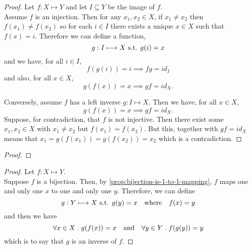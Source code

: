 \documentclass[../MathsNotesBase.tex]{subfiles}
\begin{document}
{		\bigskip
		\begin{proof}
			Let ${ f: X \longmapsto Y }$ and let ${ I \subseteq Y }$ be the image of $f$.\\
			
			Assume $f$ is an injection. Then for any ${ x_1, x_2 \in X }$, if ${ x_1 \neq x_2 }$ then ${ f(x_1) \neq f(x_2) }$ so for each ${ i \in I }$ there exists a unique ${ x \in X }$ such that ${ f(x) = i }$. Therefore we can define a function,
			\[ g: I \longmapsto X \text{ s.t. } g(i) = x \]
			and we have, for all ${ i \in I }$,
			\[ f(g(i)) = i \implies fg = id_I \]
			and also, for all ${ x \in X }$,
			\[ g(f(x)) = x \implies gf = id_X. \]
			
			Conversely, assume $f$ has a left inverse ${ g: I \longmapsto X }$. Then we have, for all ${ x \in X }$,
			\[ g(f(x)) = x \implies gf = id_X. \]
			Suppose, for contradiction, that $f$ is not injective. Then there exist some ${ x_1, x_2 \in X }$ with ${ x_1 \neq x_2 }$ but ${ f(x_1) = f(x_2) }$. But this, together with ${ gf = id_X }$ means that ${ x_1 = g(f(x_1)) = g(f(x_2)) = x_2 }$ which is a contradiction.
		\end{proof}
	
		\bigskip
		\begin{proof}
		\end{proof}
		
		\bigskip
		\begin{proof}
			Let ${ f: X \longmapsto Y }$.\\
			
			Suppose $f$ is a bijection. Then, by \autoref{prop:bijection-is-1-to-1-mapping}, $f$ maps one and only one $x$ to one and only one $y$. Therefore, we can define
			\[ g: Y \longmapsto X \text{ s.t. } g(y) = x \hspace{10pt}\text{where}\hspace{10pt} f(x) = y \]
			and then we have
			\[ \forall x \in X \;.\; g(f(x)) = x \hspace{10pt}\text{and}\hspace{10pt} \forall y \in Y \;.\; f(g(y)) = y \]
			which is to say that $g$ is an inverse of $f$.
			

\end{proof}}
\end{document}
